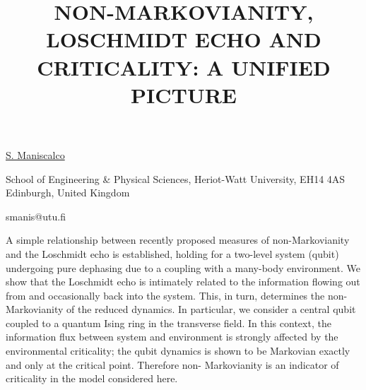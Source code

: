 \title{NON-MARKOVIANITY, LOSCHMIDT ECHO AND CRITICALITY: A UNIFIED PICTURE}

\underline{S. Maniscalco} 

{\normalsize{\vspace{-4mm}
School of Engineering \& Physical Sciences, Heriot-Watt University, EH14 4AS Edinburgh, United Kingdom

\email smanis@utu.fi}}

A simple relationship between recently proposed measures of non-Markovianity and the Loschmidt echo is established, holding for
a two-level system (qubit) undergoing pure dephasing due to a coupling with a many-body environment. We show that the
Loschmidt echo is intimately related to the information flowing out from and occasionally back into the system. This, in turn,
determines the non-Markovianity of the reduced dynamics. In particular, we consider a central qubit coupled to a quantum Ising ring
in the transverse field. In this context, the information flux between system and environment is strongly affected by the
environmental criticality; the qubit dynamics is shown to be Markovian exactly and only at the critical point. Therefore non-
Markovianity is an indicator of criticality in the model considered here.

\vspace{\baselineskip} 